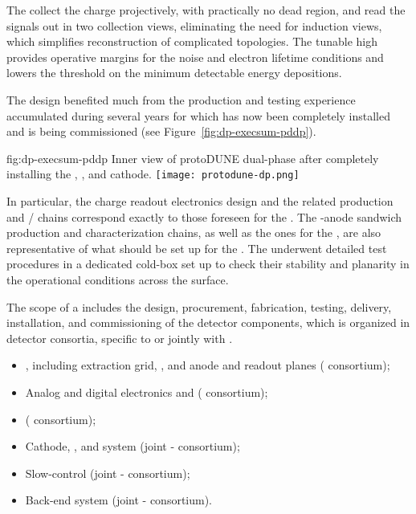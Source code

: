 The  collect the charge projectively,  with practically no dead region, and read the signals out  in two collection views, eliminating the need for  induction views,  which  simplifies reconstruction of complicated topologies. The tunable high  provides operative margins for the noise and electron lifetime conditions and lowers the threshold on the minimum detectable energy depositions.

The  design benefited much from the production and testing experience accumulated during several years for  which has now been completely installed and is being commissioned (see Figure~\ref{fig:dp-execsum-pddp}). 

\begin{dunefigure}{fig:dp-execsum-pddp}
  {Inner view of protoDUNE dual-phase after completely installing the , , and cathode.}
  \texttt{[image: protodune-dp.png]}
\end{dunefigure}

In particular, the charge readout electronics design and the related production and / chains correspond exactly to those foreseen for the . The -anode sandwich production and characterization chains, as well as the ones for the  ,  are also representative of what should be set up for the . The  underwent detailed test procedures in a dedicated cold-box set up to check their  stability and planarity in the operational conditions across the  surface.

The scope of a  includes the design, procurement, fabrication, testing, delivery, installation, and commissioning of the detector components, which is organized in detector consortia, specific to  or jointly with . 

\begin{itemize}
\item {}, including extraction grid, , and anode and readout planes ( consortium);
\item Analog and digital electronics and  ( consortium); 
\item {} ( consortium);
\item Cathode, , and  system (joint - consortium);  
\item Slow-control (joint - consortium); 
\item Back-end  system (joint - consortium).
\end{itemize}


